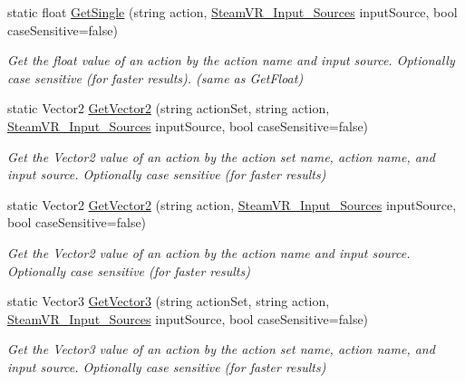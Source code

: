 \begin{DoxyCompactItemize}
static float \mbox{\hyperlink{class_valve_1_1_v_r_1_1_steam_v_r___input_a28baa91d2535512c1d9abafc38fa715e}{Get\+Single}} (string action, \mbox{\hyperlink{namespace_valve_1_1_v_r_a82e5bf501cc3aa155444ee3f0662853f}{Steam\+V\+R\+\_\+\+Input\+\_\+\+Sources}} input\+Source, bool case\+Sensitive=false)
\begin{DoxyCompactList}\small\item\em Get the float value of an action by the action name and input source. Optionally case sensitive (for faster results). (same as Get\+Float) \end{DoxyCompactList}\item 
static Vector2 \mbox{\hyperlink{class_valve_1_1_v_r_1_1_steam_v_r___input_a247ed60610c296f131fbed9e62f8628c}{Get\+Vector2}} (string action\+Set, string action, \mbox{\hyperlink{namespace_valve_1_1_v_r_a82e5bf501cc3aa155444ee3f0662853f}{Steam\+V\+R\+\_\+\+Input\+\_\+\+Sources}} input\+Source, bool case\+Sensitive=false)
\begin{DoxyCompactList}\small\item\em Get the Vector2 value of an action by the action set name, action name, and input source. Optionally case sensitive (for faster results) \end{DoxyCompactList}\item 
static Vector2 \mbox{\hyperlink{class_valve_1_1_v_r_1_1_steam_v_r___input_a9b7191614c93cbd5f60c37e3215be5da}{Get\+Vector2}} (string action, \mbox{\hyperlink{namespace_valve_1_1_v_r_a82e5bf501cc3aa155444ee3f0662853f}{Steam\+V\+R\+\_\+\+Input\+\_\+\+Sources}} input\+Source, bool case\+Sensitive=false)
\begin{DoxyCompactList}\small\item\em Get the Vector2 value of an action by the action name and input source. Optionally case sensitive (for faster results) \end{DoxyCompactList}\item 
static Vector3 \mbox{\hyperlink{class_valve_1_1_v_r_1_1_steam_v_r___input_ac3cca4444dffe8400eddcec5fd8a003d}{Get\+Vector3}} (string action\+Set, string action, \mbox{\hyperlink{namespace_valve_1_1_v_r_a82e5bf501cc3aa155444ee3f0662853f}{Steam\+V\+R\+\_\+\+Input\+\_\+\+Sources}} input\+Source, bool case\+Sensitive=false)
\begin{DoxyCompactList}\small\item\em Get the Vector3 value of an action by the action set name, action name, and input source. Optionally case sensitive (for faster results) \end{DoxyCompactList}\item 

\end{DoxyCompactItemize}
